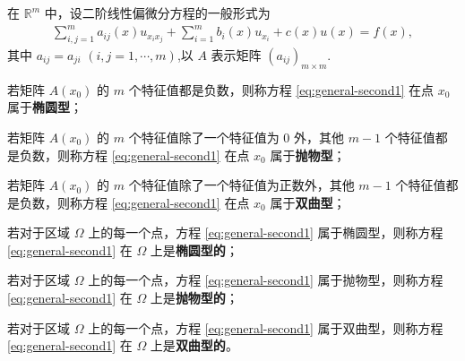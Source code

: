 \documentclass[../../main.tex]{subfiles}%
\begin{document}
\begin{definition}
在 $\mathbb{R}^m$ 中，设二阶线性偏微分方程的一般形式为
\begin{align}
\sum_{i,j=1}^{m} a_{ij}(x) u_{x_i x_j} + \sum_{i=1}^{m} b_i(x) u_{x_i} + c(x) u(x) = f(x),\label{eq:general-second1}
\end{align}
其中 $a_{ij}=a_{ji}$ $(i,j=1,\cdots,m)$,以 $A$ 表示矩阵 $(a_{ij})_{m\times m}$.

若矩阵 $A(x_0)$ 的 $m$ 个特征值都是负数，则称方程 \eqref{eq:general-second1} 在点 $x_0$ 属于\textbf{椭圆型}；

若矩阵 $A(x_0)$ 的 $m$ 个特征值除了一个特征值为 $0$ 外，其他 $m-1$ 个特征值都是负数，则称方程 \eqref{eq:general-second1} 在点 $x_0$ 属于\textbf{抛物型}；

若矩阵 $A(x_0)$ 的 $m$ 个特征值除了一个特征值为正数外，其他 $m-1$ 个特征值都是负数，则称方程 \eqref{eq:general-second1} 在点 $x_0$ 属于\textbf{双曲型}；

若对于区域 $\Omega$ 上的每一个点，方程 \eqref{eq:general-second1} 属于椭圆型，则称方程 \eqref{eq:general-second1} 在 $\Omega$ 上是\textbf{椭圆型的}；

若对于区域 $\Omega$ 上的每一个点，方程 \eqref{eq:general-second1} 属于抛物型，则称方程 \eqref{eq:general-second1} 在 $\Omega$ 上是\textbf{抛物型的}；

若对于区域 $\Omega$ 上的每一个点，方程 \eqref{eq:general-second1} 属于双曲型，则称方程 \eqref{eq:general-second1} 在 $\Omega$ 上是\textbf{双曲型的}。
\end{definition}
\end{document}
